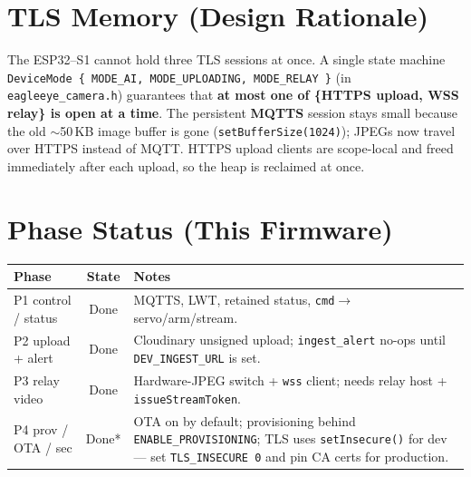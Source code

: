 \documentclass[11pt,a4paper]{article}
\newcommand{\code}[1]{\texttt{#1}}
\begin{document}
\section{TLS Memory (Design Rationale)}
The ESP32--S1 cannot hold three TLS sessions at once. A single state machine
\code{DeviceMode \{ MODE\_AI, MODE\_UPLOADING, MODE\_RELAY \}} (in \code{eagleeye\_camera.h})
guarantees that \textbf{at most one of \{HTTPS upload, WSS relay\} is open at a time}. The
persistent \textbf{MQTTS} session stays small because the old $\sim$50\,KB image buffer is gone
(\code{setBufferSize(1024)}); JPEGs now travel over HTTPS instead of MQTT. HTTPS upload clients
are scope-local and freed immediately after each upload, so the heap is reclaimed at once.

\section{Phase Status (This Firmware)}
\renewcommand{\arraystretch}{1.3}
\begin{tabularx}{\linewidth}{@{}lcX@{}}
\toprule
\textbf{Phase} & \textbf{State} & \textbf{Notes} \\
\midrule
P1 control / status & Done & MQTTS, LWT, retained status, \code{cmd}$\rightarrow$servo/arm/stream. \\
P2 upload + alert   & Done & Cloudinary unsigned upload; \code{ingest\_alert} no-ops until \code{DEV\_INGEST\_URL} is set. \\
P3 relay video      & Done & Hardware-JPEG switch + \code{wss} client; needs relay host + \code{issueStreamToken}. \\
P4 prov / OTA / sec & Done* & OTA on by default; provisioning behind \code{ENABLE\_PROVISIONING}; TLS uses \code{setInsecure()} for dev --- set \code{TLS\_INSECURE 0} and pin CA certs for production. \\
\bottomrule
\end{tabularx}

\end{document}
